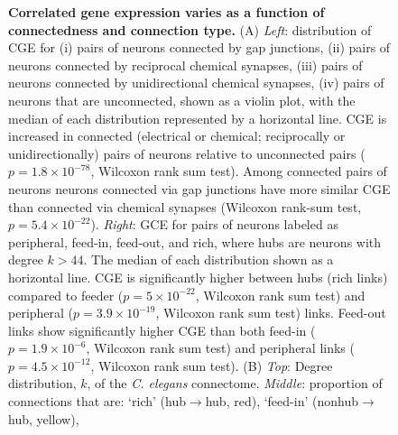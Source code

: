  \begin{figure}[!h]
\caption{{\bf Correlated gene expression varies as a function of connectedness and connection type.}
(A) \textit{Left}: distribution of CGE for (i) pairs of neurons connected by gap junctions, (ii) pairs of neurons connected by reciprocal chemical synapses, (iii) pairs of neurons connected by unidirectional chemical synapses, (iv) pairs of neurons that are unconnected, shown as a violin plot, with the median of each distribution represented by a horizontal line.
CGE is increased in connected (electrical or chemical; reciprocally or unidirectionally) pairs of neurons relative to unconnected pairs ($p = 1.8 \times 10^{-78}$, Wilcoxon rank sum test).
Among connected pairs of neurons neurons connected via gap junctions have more similar CGE than connected via chemical synapses (Wilcoxon rank-sum test, $p = 5.4 \times 10^{-22}$).
\textit{Right}: GCE for pairs of neurons labeled as peripheral, feed-in, feed-out, and rich, where hubs are neurons with degree $k>44$. The median of each distribution shown as a horizontal line.
CGE is significantly higher between hubs (rich links) compared to feeder ($p = 5 \times 10^{-22}$, Wilcoxon rank sum test) and peripheral ($p = 3.9 \times 10^{-19}$, Wilcoxon rank sum test) links.
Feed-out links show significantly higher CGE than both feed-in ($p = 1.9 \times 10^{-6}$, Wilcoxon rank sum test) and peripheral links ($p = 4.5 \times 10^{-12}$, Wilcoxon rank sum test).
(B)
\emph{Top}: Degree distribution, $k$, of the \emph{C. elegans} connectome.
\emph{Middle}: proportion of connections that are:
`rich' (hub$\rightarrow$hub, red),
`feed-in' (nonhub$\rightarrow$hub, yellow),
}
\end{figure}
